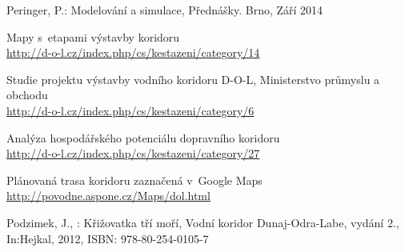 \documentclass[11pt,a4paper]{article}
\begin{document}
    \begin{enumerate}[label={[\arabic*]}]
      \item Peringer, P.: Modelování a simulace, Přednášky. Brno, Září 2014
        \label{peringer}
      \item Mapy s~etapami výstavby koridoru \\
        \href{http://d-o-l.cz/index.php/cs/kestazeni/category/14}
        {http://d-o-l.cz/index.php/cs/kestazeni/category/14} \label{mapa}
      \item Studie projektu výstavby vodního koridoru D-O-L,
            Ministerstvo průmyslu a obchodu \\
        \href{http://d-o-l.cz/index.php/cs/kestazeni/category/6}
             {http://d-o-l.cz/index.php/cs/kestazeni/category/6} \label{studie}
      \item Analýza hospodářského potenciálu dopravního koridoru \\
        \href{http://d-o-l.cz/index.php/cs/kestazeni/category/27}
             {http://d-o-l.cz/index.php/cs/kestazeni/category/27} \label{analyza}
      \item Plánovaná trasa koridoru zaznačená v~Google Maps \\
        \href{http://povode.aspone.cz/Maps/dol.html}
             {http://povodne.aspone.cz/Maps/dol.html} \label{google-mapa}
      \item Podzimek, J., : Křižovatka tří moří, Vodní koridor Dunaj-Odra-Labe,
            vydání 2., In:Hejkal, 2012, ISBN: 978-80-254-0105-7 \label{kniha}
    \end{enumerate}

  
\end{document}
